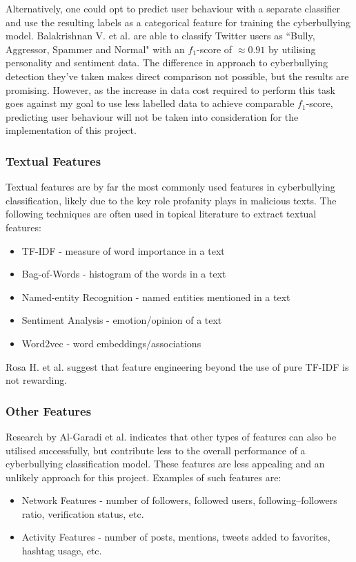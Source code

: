 \documentclass[a4paper,12pt]{article}
\begin{document}
Alternatively, one could opt to predict user behaviour with a separate classifier and use the resulting labels as a categorical feature for training the cyberbullying model. Balakrishnan V. et al. \cite{Balakrishnan2020} are able to classify Twitter users as ``Bully, Aggressor, Spammer and Normal" with an $f_1$-score of $\approx0.91$ by utilising personality and sentiment data. The difference in approach to cyberbullying detection they've taken makes direct comparison not possible, but the results are promising. However, as the increase in data cost required to perform this task goes against my goal to use less labelled data to achieve comparable $f_1$-score, predicting user behaviour will not be taken into consideration for the implementation of this project.
\subsubsection{Textual Features}
Textual features are by far the most commonly used features in cyberbullying classification, likely due to the key role profanity plays in malicious texts.
The following techniques are often used in topical literature to extract textual features:
\begin{itemize}
    \item TF-IDF - measure of word importance in a text
    \item Bag-of-Words - histogram of the words in a text
    \item Named-entity Recognition - named entities mentioned in a text
    \item Sentiment Analysis - emotion/opinion of a text
    \item Word2vec - word embeddings/associations
\end{itemize}
Rosa H. et al. \cite{Rosa2019} suggest that feature engineering beyond the use of pure TF-IDF is not rewarding.
\subsubsection{Other Features}
Research by Al-Garadi et al. \cite{garadi-highestf/top10features} indicates that other types of features can also be utilised successfully, but contribute less to the overall performance of a cyberbullying classification model. These features are less appealing and an unlikely approach for this project. Examples of such features are:
\begin{itemize}
    \item Network Features - number of followers, followed users, following–followers ratio, verification status, etc.
    \item Activity Features - number of posts, mentions, tweets added to favorites, hashtag usage, etc.
\end{itemize}
\end{document}
